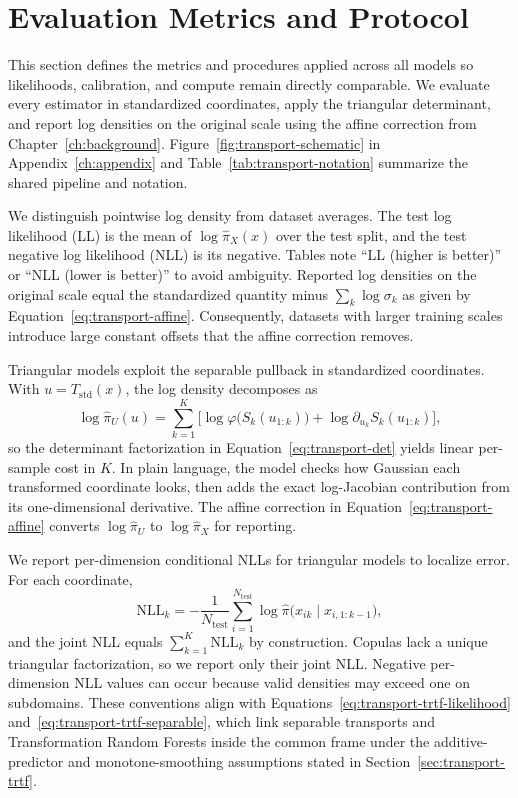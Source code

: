 \documentclass[11pt,a4paper,twoside]{book}\usepackage[]{graphicx}\usepackage[]{xcolor}
\begin{document}
\section{Evaluation Metrics and Protocol}\label{sec:evaluation-protocol}

This section defines the metrics and procedures applied across all models so likelihoods, calibration, and compute remain directly comparable. We evaluate every estimator in standardized coordinates, apply the triangular determinant, and report log densities on the original scale using the affine correction from Chapter~\ref{ch:background}. Figure~\ref{fig:transport-schematic} in Appendix~\ref{ch:appendix} and Table~\ref{tab:transport-notation} summarize the shared pipeline and notation.

We distinguish pointwise log density from dataset averages. The test log likelihood (LL) is the mean of $\log \hat{\pi}_X(x)$ over the test split, and the test negative log likelihood (NLL) is its negative. Tables note “LL (higher is better)” or “NLL (lower is better)” to avoid ambiguity. Reported log densities on the original scale equal the standardized quantity minus $\sum_k \log \sigma_k$ as given by Equation~\eqref{eq:transport-affine}. Consequently, datasets with larger training scales introduce large constant offsets that the affine correction removes.

Triangular models exploit the separable pullback in standardized coordinates. With $u = T_{\mathrm{std}}(x)$, the log density decomposes as
\begin{equation}
  \log \hat{\pi}_U(u) = \sum_{k=1}^{K} \Big[ \log \varphi\big(S_k(u_{1:k})\big) + \log \partial_{u_k} S_k(u_{1:k}) \Big],
  \label{eq:evaluation-triangular}
\end{equation}
so the determinant factorization in Equation~\eqref{eq:transport-det} yields linear per-sample cost in $K$. In plain language, the model checks how Gaussian each transformed coordinate looks, then adds the exact log-Jacobian contribution from its one-dimensional derivative. The affine correction in Equation~\eqref{eq:transport-affine} converts $\log \hat{\pi}_U$ to $\log \hat{\pi}_X$ for reporting.

We report per-dimension conditional NLLs for triangular models to localize error. For each coordinate,
\begin{equation}
  \mathrm{NLL}_k = -\frac{1}{N_{\mathrm{test}}} \sum_{i=1}^{N_{\mathrm{test}}} \log \hat{\pi}\big(x_{ik} \mid x_{i,1:k-1}\big),
  \label{eq:evaluation-conditional-nll}
\end{equation}
and the joint NLL equals $\sum_{k=1}^{K} \mathrm{NLL}_k$ by construction. Copulas lack a unique triangular factorization, so we report only their joint NLL. Negative per-dimension NLL values can occur because valid densities may exceed one on subdomains. These conventions align with Equations~\eqref{eq:transport-trtf-likelihood} and~\eqref{eq:transport-trtf-separable}, which link separable transports and Transformation Random Forests inside the common frame under the additive-predictor and monotone-smoothing assumptions stated in Section~\ref{sec:transport-trtf}.
\end{document}
